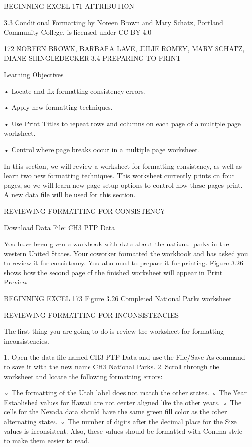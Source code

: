 BEGINNING EXCEL 171
ATTRIBUTION

3.3 Conditional Formatting by Noreen Brown and Mary Schatz, Portland Community College, is
licensed under CC BY 4.0




172 NOREEN BROWN, BARBARA LAVE, JULIE ROMEY, MARY SCHATZ, DIANE SHINGLEDECKER
3.4 PREPARING TO PRINT




Learning Objectives


• Locate and fix formatting consistency errors.

• Apply new formatting techniques.

• Use Print Titles to repeat rows and columns on each page of a multiple page worksheet.

• Control where page breaks occur in a multiple page worksheet.



In this section, we will review a worksheet for formatting consistency, as well as learn two new
formatting techniques. This worksheet currently prints on four pages, so we will learn new page setup
options to control how these pages print. A new data file will be used for this section.

REVIEWING FORMATTING FOR CONSISTENCY

Download Data File: CH3 PTP Data

You have been given a workbook with data about the national parks in the western United States.
Your coworker formatted the workbook and has asked you to review it for consistency. You also need
to prepare it for printing. Figure 3.26 shows how the second page of the finished worksheet will
appear in Print Preview.




BEGINNING EXCEL 173
Figure 3.26 Completed National Parks worksheet


REVIEWING FORMATTING FOR INCONSISTENCIES

The first thing you are going to do is review the worksheet for formatting inconsistencies.

1. Open the data file named CH3 PTP Data and use the File/Save As command to save it with the
new name CH3 National Parks.
2. Scroll through the worksheet and locate the following formatting errors:

◦ The formatting of the Utah label does not match the other states.
◦ The Year Established values for Hawaii are not center aligned like the other years.
◦ The cells for the Nevada data should have the same green fill color as the other alternating
states.
◦ The number of digits after the decimal place for the Size values is inconsistent. Also, these
values should be formatted with Comma style to make them easier to read.

